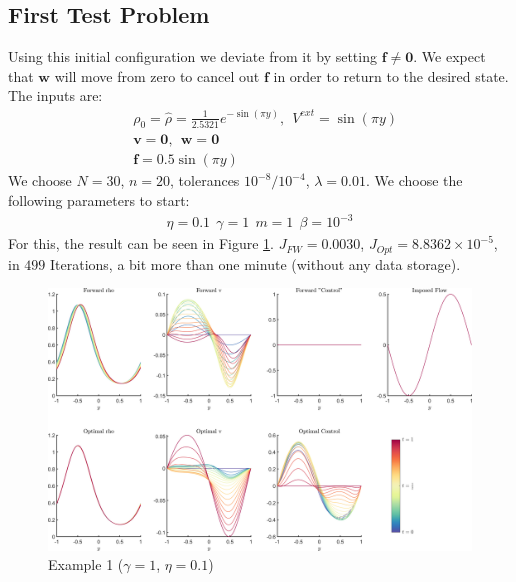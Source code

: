 \documentclass[11pt, a4paper]{article}
\theoremstyle{definition}
\newcommand{\Sta}{\rho}
\newcommand{\Stav}{\mathbf{v}}
\newcommand{\Con}{\mathbf{f}}
\begin{document}
\subsection{First Test Problem}
   Using this initial configuration we deviate from it by setting $\Con \neq \mathbf{0}$. We expect that $\mathbf{w}$ will move from zero to cancel out $\Con$ in order to return to the desired state.
   The inputs are:
   \begin{align*}
   &\Sta_0 = \hat \Sta =  \frac{1}{2.5321}e^{-\sin(\pi y)}, \ \ V^{ext} = \sin(\pi y)\\
   &\Stav = \mathbf{0}, \ \  \mathbf{w} = \mathbf{0}\\
   &\Con = 0.5\sin(\pi y) 
   \end{align*}
   We choose $N = 30$, $n = 20$, tolerances $10^{-8}/10^{-4}$, $\lambda = 0.01$.
   We choose the following parameters to start:
   \begin{align*}
   \eta = 0.1\ \
   \gamma = 1\ \
   m = 1\ \
   \beta = 10^{-3}
   \end{align*}
   For this, the result can be seen in Figure \ref{fig1}. $J_{FW} = 0.0030$, $J_{Opt}= 8.8362 \times 10^{-5}$, in $499$ Iterations, a bit more than one minute (without any data storage).
   \begin{figure}
   	\includegraphics[scale=0.05]{Example1.png}
   	\caption{Example 1 ($\gamma = 1$, $\eta = 0.1$)}
   	\label{fig1}
   \end{figure}
\end{document}
